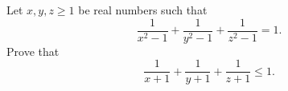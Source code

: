 Let $x,y,z \ge 1$ be real numbers such that \[ \frac{1}{x^2-1} + \frac{1}{y^2-1} + \frac{1}{z^2-1} = 1. \] Prove that \[ \frac{1}{x+1} + \frac{1}{y+1} + \frac{1}{z+1} \le 1. \]